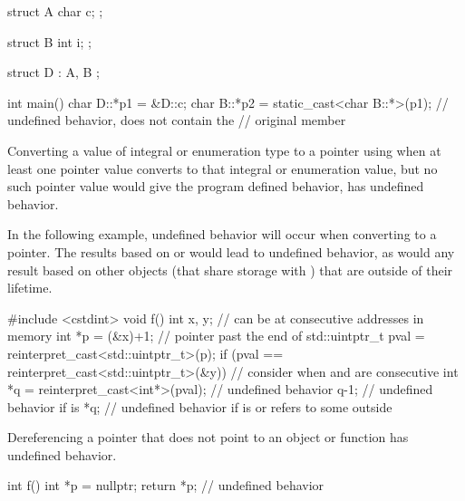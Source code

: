 \pnum
\begin{example}
\begin{codeblock}
struct A {
  char c;
};

struct B {
  int i;
};

struct D : A, B {};

int main() {
  char D::*p1 = &D::c;
  char B::*p2 = static_cast<char B::*>(p1); // undefined behavior,  does not contain the
                                            // original member 
}
\end{codeblock}
\end{example}


\pnum
Converting a value of integral or enumeration type
to a pointer using 
when at least one pointer value
converts to
that integral or enumeration value,
but no such pointer value would
give the program defined behavior,
has undefined behavior.

\pnum
\begin{example}
In the following example,
undefined behavior will occur
when converting  to a pointer.
The results based on
 or 
would lead to undefined behavior,
as would any result based on
other objects (that share storage with )
that are outside of their lifetime.
\begin{codeblock}
#include <cstdint>
void f()
{
  int x, y;         // can be at consecutive addresses in memory
  int *p = (&x)+1;  // pointer past the end of 
  std::uintptr_t pval = reinterpret_cast<std::uintptr_t>(p);
  if (pval == reinterpret_cast<std::uintptr_t>(&y)) {   // consider when  and  are consecutive
    int *q = reinterpret_cast<int*>(pval);  // undefined behavior
    q-1;                            // undefined behavior if  is 
    *q;                             // undefined behavior if  is  or refers to some  outside 
  }
}
\end{codeblock}
\end{example}


\pnum
Dereferencing a pointer that does not point to an object or function
has undefined behavior.

\pnum
\begin{example}
\begin{codeblock}
int f()
{
  int *p = nullptr;
  return *p;    // undefined behavior
}
\end{codeblock}
\end{example}

